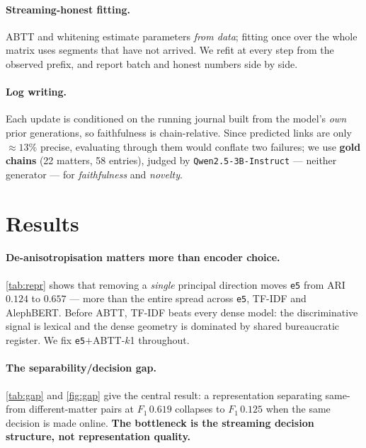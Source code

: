 \documentclass[11pt]{article}
\begin{document}
\paragraph{Streaming-honest fitting.}
ABTT and whitening estimate parameters \emph{from data}; fitting once over the whole matrix
uses segments that have not arrived. We refit at every step from the observed prefix, and
report batch and honest numbers side by side.

\vspace{-2pt}

\paragraph{Log writing.}
Each update is conditioned on the running journal built from the model's \emph{own} prior
generations, so faithfulness is chain-relative. Since predicted links are only
${\approx}13\%$ precise, evaluating through them would conflate two failures; we use
\textbf{gold chains} (22 matters, 58 entries), judged by \texttt{Qwen2.5-3B-Instruct} ---
neither generator --- for \emph{faithfulness} and \emph{novelty}.

\section{Results}

\paragraph{De-anisotropisation matters more than encoder choice.}
\cref{tab:repr} shows that removing a \emph{single} principal direction moves \texttt{e5}
from ARI $0.124$ to $0.657$ --- more than the entire spread across \texttt{e5}, TF-IDF and
AlephBERT. Before ABTT, TF-IDF beats every dense model: the discriminative signal is lexical
and the dense geometry is dominated by shared bureaucratic register. We fix
\texttt{e5}$+$ABTT-$k$1 throughout.

\paragraph{The separability/decision gap.}
\cref{tab:gap} and \cref{fig:gap} give the central result: a representation separating
same- from different-matter pairs at $F_1\,0.619$ collapses to $F_1\,0.125$ when the same
decision is made online. \textbf{The bottleneck is the streaming decision structure, not
representation quality.}
\end{document}
